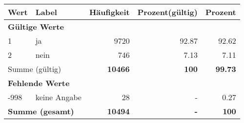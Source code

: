      \begin{longtable}{lXrrr}
     \toprule
     \textbf{Wert} & \textbf{Label} & \textbf{Häufigkeit} & \textbf{Prozent(gültig)} & \textbf{Prozent} \\
     \endhead
     \midrule
     \multicolumn{5}{l}{\textbf{Gültige Werte}}\\

     1 &
     \multicolumn{1}{X}{ ja   } &


       \num{9720} &
       \num[round-mode=places,round-precision=2]{92.87} &
         \num[round-mode=places,round-precision=2]{92.62} \\

     2 &
     \multicolumn{1}{X}{ nein   } &


       \num{746} &
       \num[round-mode=places,round-precision=2]{7.13} &
         \num[round-mode=places,round-precision=2]{7.11} \\
     \midrule
     \multicolumn{2}{l}{Summe (gültig)} &
       \textbf{\num{10466}} &
     \textbf{\num{100}} &
       \textbf{\num[round-mode=places,round-precision=2]{99.73}} \\
     \multicolumn{5}{l}{\textbf{Fehlende Werte}}\\
       -998 &
       keine Angabe &
         \num{28} &
        - &
         \num[round-mode=places,round-precision=2]{0.27} \\
     \midrule
     \multicolumn{2}{l}{\textbf{Summe (gesamt)}} &
          \textbf{\num{10494}} &
        \textbf{-} &
        \textbf{\num{100}} \\
     \bottomrule
     \end{longtable}
     
